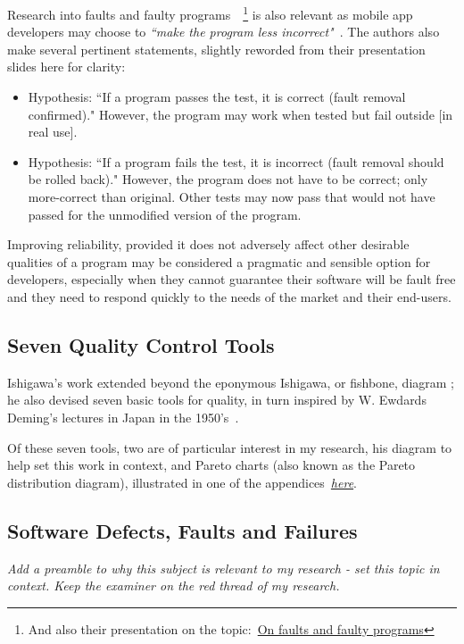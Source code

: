 Research into faults and faulty programs~\cite{mili2014_on_faults_and_faulty_programs}~\footnote{And also their presentation on the topic:~\href{http://mathcs.chapman.edu/ramics2014/slides/MiliFriasJaouaRAMiCS2014.pdf}{On faults and faulty programs}} is also relevant as mobile app developers may choose to \emph{``make the program less incorrect"}~\cite{mili2014_on_faults_and_faulty_programs}. The authors also make several pertinent statements, slightly reworded from their presentation slides here for clarity:
\begin{itemize}
    \item Hypothesis: ``If a program passes the test, it is correct (fault removal confirmed)." However, the program may work when tested but fail outside [in real use].
    \item Hypothesis: ``If a program fails the test, it is incorrect (fault removal should be rolled back)." However, the program does not have to be correct; only more-correct than original. Other tests may now pass that would not have passed for the unmodified version of the program.
\end{itemize}

Improving reliability, provided it does not adversely affect other desirable qualities of a program may be considered a pragmatic and sensible option for developers, especially when they cannot guarantee their software will be fault free and they need to respond quickly to the needs of the market and their end-users.



\subsection{Seven Quality Control Tools}
Ishigawa's work extended beyond the eponymous Ishigawa, or fishbone, diagram %
; he also devised seven basic tools for quality, in turn inspired by W. Ewdards Deming's lectures in Japan in the 1950's~\cite{7_basic_quality_tools_with_R}.

Of these seven tools, two are of particular interest in my research, his diagram to help set this work in context, and Pareto charts (also known as the Pareto distribution diagram), illustrated in one of the appendices~\hyperlink{pareto.diagrams.in.r}{\emph{here}}.


\hypertarget{defects.faults.failures}{}
\subsection{Software Defects, Faults and Failures}
\emph{Add a preamble to why this subject is relevant to my research - set this topic in context. Keep the examiner on the red thread of my research.}


